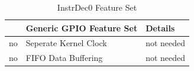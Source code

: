 \begin{table}[H]
\caption{InstrDec0 Feature Set}
\label{tab:asCoreInstrDec01}
\centering
\begin{tabularx}{\textwidth}{|l |l |X|}
  \hline
   & Generic GPIO Feature Set & Details \\
  \hline
  \hline
  no & Seperate Kernel Clock & not needed \\
  \hline
  no & FIFO Data Buffering & not needed \\
  \hline
\end{tabularx}
\end{table}
